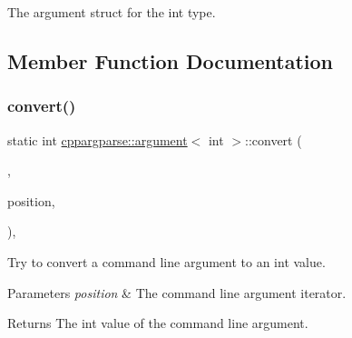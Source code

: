 The argument struct for the int type. 

\subsection{Member Function Documentation}
\mbox{\label{structcppargparse_1_1argument_3_01int_01_4_a8c3b45ea01897660bf5d1e5f7c9d7c41}} 
\subsubsection{\texorpdfstring{convert()}{convert()}}
{\footnotesize\ttfamily static int \hyperlink{structcppargparse_1_1argument}{cppargparse\+::argument}$<$ int $>$\+::convert (\begin{DoxyParamCaption}\item[{const types\+::\+Command\+Line\+\_\+t \&}]{,  }\item[{const types\+::\+Command\+Line\+Position\+\_\+t \&}]{position,  }\item[{const types\+::\+Command\+Line\+Arguments\+\_\+t \&}]{ }\end{DoxyParamCaption})\hspace{0.3cm}{\ttfamily [inline]}, {\ttfamily [static]}}



Try to convert a command line argument to an int value. 


\begin{DoxyParams}{Parameters}
{\em position} & The command line argument iterator.\\
\hline
\end{DoxyParams}
\begin{DoxyReturn}{Returns}
The int value of the command line argument. 
\end{DoxyReturn}
\mbox{\label{structcppargparse_1_1argument_3_01int_01_4_af6a2f748b086ad7122f7bb6affbe354e}} 
